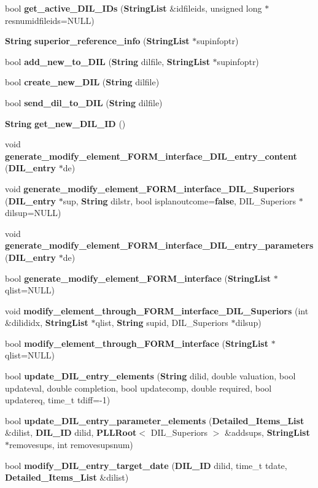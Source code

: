 \begin{CompactItemize}
\item 
bool {\bf get\_\-active\_\-DIL\_\-IDs} ({\bf String\-List} \&idfileids, unsigned long $\ast$resnumidfileids=NULL)
\item 
{\bf String} {\bf superior\_\-reference\_\-info} ({\bf String\-List} $\ast$supinfoptr)
\item 
bool {\bf add\_\-new\_\-to\_\-DIL} ({\bf String} dilfile, {\bf String\-List} $\ast$supinfoptr)
\item 
bool {\bf create\_\-new\_\-DIL} ({\bf String} dilfile)
\item 
bool {\bf send\_\-dil\_\-to\_\-DIL} ({\bf String} dilfile)
\item 
{\bf String} {\bf get\_\-new\_\-DIL\_\-ID} ()
\item 
void {\bf generate\_\-modify\_\-element\_\-FORM\_\-interface\_\-DIL\_\-entry\_\-content} ({\bf DIL\_\-entry} $\ast$de)
\item 
void {\bf generate\_\-modify\_\-element\_\-FORM\_\-interface\_\-DIL\_\-Superiors} ({\bf DIL\_\-entry} $\ast$sup, {\bf String} dilstr, bool isplanoutcome={\bf false}, DIL\_\-Superiors $\ast$dilsup=NULL)
\item 
void {\bf generate\_\-modify\_\-element\_\-FORM\_\-interface\_\-DIL\_\-entry\_\-parameters} ({\bf DIL\_\-entry} $\ast$de)
\item 
bool {\bf generate\_\-modify\_\-element\_\-FORM\_\-interface} ({\bf String\-List} $\ast$qlist=NULL)
\item 
void {\bf modify\_\-element\_\-through\_\-FORM\_\-interface\_\-DIL\_\-Superiors} (int \&dilididx, {\bf String\-List} $\ast$qlist, {\bf String} supid, DIL\_\-Superiors $\ast$dilsup)
\item 
bool {\bf modify\_\-element\_\-through\_\-FORM\_\-interface} ({\bf String\-List} $\ast$qlist=NULL)
\item 
bool {\bf update\_\-DIL\_\-entry\_\-elements} ({\bf String} dilid, double valuation, bool updateval, double completion, bool updatecomp, double required, bool updatereq, time\_\-t tdiff=-1)
\item 
bool {\bf update\_\-DIL\_\-entry\_\-parameter\_\-elements} ({\bf Detailed\_\-Items\_\-List} \&dilist, {\bf DIL\_\-ID} dilid, {\bf PLLRoot}$<$ DIL\_\-Superiors $>$ \&addsups, {\bf String\-List} $\ast$removesups, int removesupsnum)
\item 
bool {\bf modify\_\-DIL\_\-entry\_\-target\_\-date} ({\bf DIL\_\-ID} dilid, time\_\-t tdate, {\bf Detailed\_\-Items\_\-List} \&dilist)

\end{CompactItemize}
